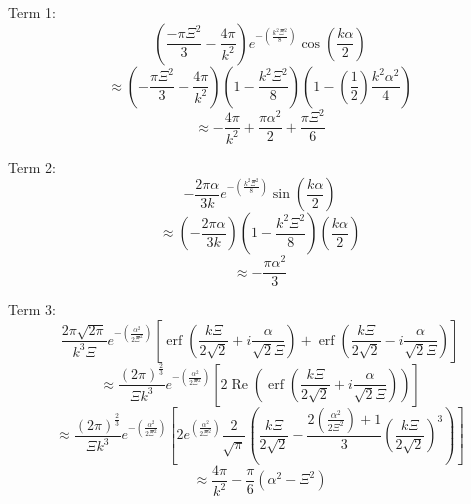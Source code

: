\documentclass[double,12pt]{beavtex}
\begin{document}
Term 1: 
\begin{equation}{\left(\frac{-\pi\Xi^2}{3}-\frac{4\pi}{k^2}\right)e^{-\left(\frac{k^2\Xi^2}{8}\right)}\cos(\frac{k\alpha}{2})}\end{equation}
\begin{displaymath}{\approx\left(-\frac{\pi\Xi^2}{3}-\frac{4\pi}{k^2}\right)\left(1-\frac{k^2\Xi^2}{8}\right)\left(1-\left(\frac{1}{2}\right)\frac{k^2\alpha^2}{4}\right)}\end{displaymath} 
\begin{displaymath}{\approx-\frac{4\pi}{k^2}+\frac{\pi\alpha^2}{2}+\frac{\pi\Xi^2}{6}}\end{displaymath} 

Term 2:
\begin{equation}{-\frac{2\pi\alpha}{3k}e^{-\left(\frac{k^2\Xi^2}{8}\right)}\sin(\frac{k\alpha}{2})}\end{equation} 
\begin{displaymath}{\approx\left(-\frac{2\pi\alpha}{3k}\right)\left(1-\frac{k^2\Xi^2}{8}\right)\left(\frac{k\alpha}{2}\right)}\end{displaymath} 
\begin{displaymath}{\approx}-\frac{\pi\alpha^2}{3}\end{displaymath}
 
Term 3:
\begin{equation}{\frac{2\pi\sqrt{2\pi}}{k^3\Xi}e^{-\left(\frac{\alpha^2}{2\Xi^2}\right)}\left[\operatorname{erf}\left(\frac{k\Xi}{2\sqrt{2}}+i\frac{\alpha}{\sqrt{2}\Xi}\right)+\operatorname{erf}\left(\frac{k\Xi}{2\sqrt{2}}-i\frac{\alpha}{\sqrt{2}\Xi}\right)\right]}\end{equation}
\begin{displaymath}{\approx\frac{\left(2\pi\right)^\frac{2}{3}}{\Xi{k}^3}e^{-\left(\frac{\alpha^2}{2\Xi^2}\right)}\left[2\operatorname{Re}\left(\operatorname{erf}\left(\frac{k\Xi}{2\sqrt{2}}+i\frac{\alpha}{\sqrt{2}\Xi}\right)\right)\right]}\end{displaymath} 
\begin{displaymath}{\approx\frac{\left(2\pi\right)^\frac{2}{3}}{\Xi{k}^3}e^{-\left(\frac{\alpha^2}{2\Xi^2}\right)}\left[2e^{\left(\frac{\alpha^2}{2\Xi^2}\right)}\frac{2}{\sqrt{\pi}}   \left(\frac{k\Xi}{2\sqrt{2}}   -\frac{2\left(\frac{\alpha^2}{2\Xi^2}\right)+1}{3}\left(\frac{k\Xi}{2\sqrt{2}}\right)^3\right)\right]}\end{displaymath}
\begin{displaymath}{\approx\frac{4\pi}{k^2}-\frac{\pi}{6}\left(\alpha^2-\Xi^2\right)}\end{displaymath}  
\end{document}
